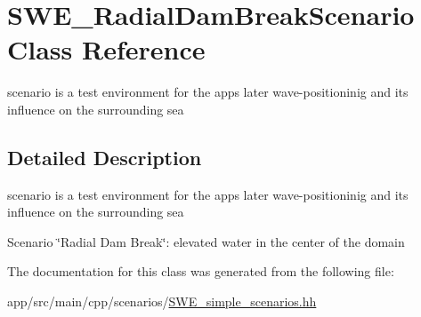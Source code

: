 \hypertarget{classSWE__RadialDamBreakScenario}{}\section{S\+W\+E\+\_\+\+Radial\+Dam\+Break\+Scenario Class Reference}
\label{classSWE__RadialDamBreakScenario}


scenario is a test environment for the apps later wave-\/positioninig and its influence on the surrounding sea  




\subsection{Detailed Description}
scenario is a test environment for the apps later wave-\/positioninig and its influence on the surrounding sea 

Scenario \char`\"{}\+Radial Dam Break\char`\"{}\+: elevated water in the center of the domain 

The documentation for this class was generated from the following file\+:\begin{DoxyCompactItemize}
\item 
app/src/main/cpp/scenarios/\hyperlink{SWE__simple__scenarios_8hh}{S\+W\+E\+\_\+simple\+\_\+scenarios.\+hh}\end{DoxyCompactItemize}
